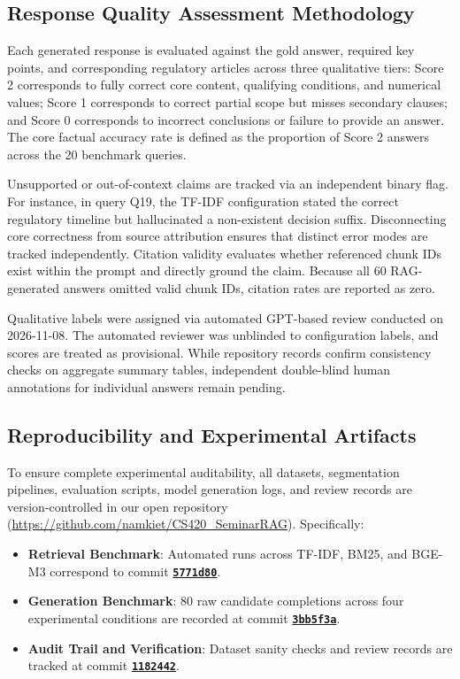 \documentclass[12pt,a4paper]{article}
\newcommand{\commitlink}[1]{\href{https://github.com/namkiet/CS420_SeminarRAG/commit/#1}{\textcolor{linkblue}{\textbf{\texttt{#1}}}}}
\begin{document}
\subsection{Response Quality Assessment Methodology}

Each generated response is evaluated against the gold answer, required key points, and corresponding regulatory articles across three qualitative tiers: Score 2 corresponds to fully correct core content, qualifying conditions, and numerical values; Score 1 corresponds to correct partial scope but misses secondary clauses; and Score 0 corresponds to incorrect conclusions or failure to provide an answer. The core factual accuracy rate is defined as the proportion of Score 2 answers across the 20 benchmark queries.

Unsupported or out-of-context claims are tracked via an independent binary flag. For instance, in query Q19, the TF-IDF configuration stated the correct regulatory timeline but hallucinated a non-existent decision suffix. Disconnecting core correctness from source attribution ensures that distinct error modes are tracked independently. Citation validity evaluates whether referenced chunk IDs exist within the prompt and directly ground the claim. Because all 60 RAG-generated answers omitted valid chunk IDs, citation rates are reported as zero.

Qualitative labels were assigned via automated GPT-based review conducted on 2026-11-08. The automated reviewer was unblinded to configuration labels, and scores are treated as provisional. While repository records confirm consistency checks on aggregate summary tables, independent double-blind human annotations for individual answers remain pending.

\subsection{Reproducibility and Experimental Artifacts}

To ensure complete experimental auditability, all datasets, segmentation pipelines, evaluation scripts, model generation logs, and review records are version-controlled in our open repository (\url{https://github.com/namkiet/CS420_SeminarRAG}). Specifically:
\begin{itemize}[leftmargin=*,itemsep=1pt,topsep=1pt]
\item \textbf{Retrieval Benchmark}: Automated runs across TF-IDF, BM25, and BGE-M3 correspond to commit \commitlink{5771d80}.
\item \textbf{Generation Benchmark}: 80 raw candidate completions across four experimental conditions are recorded at commit \commitlink{3bb5f3a}.
\item \textbf{Audit Trail and Verification}: Dataset sanity checks and review records are tracked at commit \commitlink{1182442}.
\end{itemize}
\end{document}

